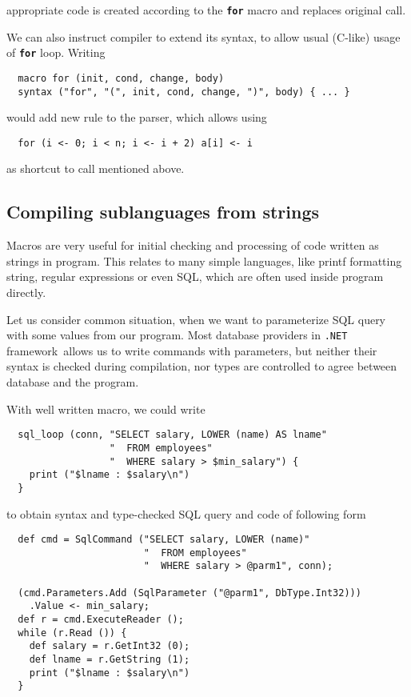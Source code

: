 \documentclass{llncs}
\newcommand{\netf}[0]{{\tt .NET} framework}
\newcommand{\kw}[1]{{\tt \bf #1}}
\begin{document}
\noindent
appropriate code is created according to the \kw{for} macro and replaces original 
call.

We can also instruct compiler to extend its syntax, to allow usual (C-like)
usage of \kw{for} loop. Writing

\begin{verbatim}
  macro for (init, cond, change, body) 
  syntax ("for", "(", init, cond, change, ")", body) { ... }
\end{verbatim}

\noindent
would add new rule to the parser, which allows using

\begin{verbatim}
  for (i <- 0; i < n; i <- i + 2) a[i] <- i
\end{verbatim}

\noindent
as shortcut to call mentioned above.

\subsection{Compiling sublanguages from strings}
Macros are very useful for initial checking and processing of code
written as strings in program. This relates to many simple languages,
like printf formatting string, regular expressions or even SQL, which are 
often used inside program directly. 

Let us consider common situation, when we want to parameterize SQL query
with some values from our program. Most database providers in 
\netf\ allows us to write commands with parameters, but neither their
syntax is checked during compilation, nor types are controlled to agree
between database and the program.

With well written macro, we could write
\begin{verbatim}
  sql_loop (conn, "SELECT salary, LOWER (name) AS lname"
                  "  FROM employees"
                  "  WHERE salary > $min_salary") {
    print ("$lname : $salary\n")
  }
\end{verbatim} %

to obtain syntax and type-checked SQL query and code of following form
\begin{verbatim}
  def cmd = SqlCommand ("SELECT salary, LOWER (name)"
                        "  FROM employees"
                        "  WHERE salary > @parm1", conn);

  (cmd.Parameters.Add (SqlParameter ("@parm1", DbType.Int32)))
    .Value <- min_salary;
  def r = cmd.ExecuteReader ();
  while (r.Read ()) {
    def salary = r.GetInt32 (0);
    def lname = r.GetString (1);
    print ("$lname : $salary\n")
  }
\end{verbatim}
\end{document}
